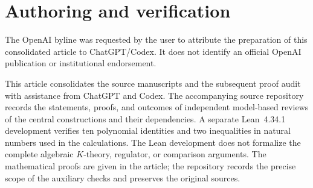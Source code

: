 \section*{Authoring and verification}
The OpenAI byline was requested by the user to attribute the preparation
of this consolidated article to ChatGPT/Codex. It does not identify an
official OpenAI publication or institutional endorsement.

This article consolidates the source manuscripts and the subsequent proof
audit with assistance from ChatGPT and Codex. The accompanying source
repository records the statements, proofs, and outcomes of independent
model-based reviews of the central constructions and their dependencies.
A separate Lean~4.34.1 development verifies ten polynomial identities
and two inequalities in natural numbers used in the calculations.
The Lean development does not formalize the complete algebraic
$K$-theory, regulator, or comparison arguments. The mathematical proofs
are given in the article; the repository records the precise scope of
the auxiliary checks and preserves the original sources.

